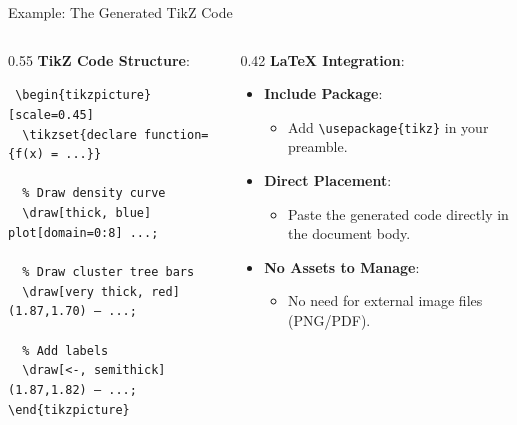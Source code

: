 \documentclass[A4,svgnames,9pt,aspectratio=169]{beamer}
\begin{document}
\begin{frame}{Example: The Generated TikZ Code}
    \begin{columns}[c, onlytextwidth]
        \begin{column}{0.55\textwidth}
            \textbf{TikZ Code Structure}:
            \begin{block}{}
                \texttt{\scriptsize
                \textbackslash begin\{tikzpicture\}[scale=0.45] \\
                \ \ \textbackslash tikzset\{declare function=\{f(x) = ...\}\} \\
                \ \ \\
                \ \ \% Draw density curve \\
                \ \ \textbackslash draw[thick, blue] plot[domain=0:8] ...; \\
                \ \ \\
                \ \ \% Draw cluster tree bars \\
                \ \ \textbackslash draw[very thick, red] (1.87,1.70) -- ...; \\
                \ \ \\
                \ \ \% Add labels \\
                \ \ \textbackslash draw[<-, semithick] (1.87,1.82) -- ...; \\
                \textbackslash end\{tikzpicture\}
                }
            \end{block}
        \end{column}
        \begin{column}{0.42\textwidth}
            \textbf{LaTeX Integration}:
            \begin{itemize}
                \setlength{\itemsep}{12pt}
                \item \textbf{Include Package}:
                \begin{itemize}
                    \item Add \texttt{\textbackslash usepackage\{tikz\}} in your preamble.
                \end{itemize}
                \item \textbf{Direct Placement}:
                \begin{itemize}
                    \item Paste the generated code directly in the document body.
                \end{itemize}
                \item \textbf{No Assets to Manage}:
                \begin{itemize}
                    \item No need for external image files (PNG/PDF).
                \end{itemize}
            \end{itemize}
        \end{column}
    \end{columns}
\end{frame}
\end{document}
